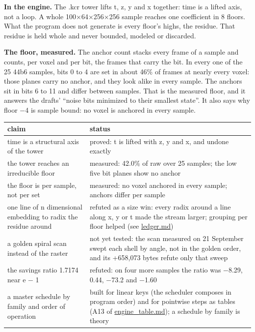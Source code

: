 \textbf{In the engine.} The .kcr tower lifts t, z, y and x together: time is a lifted axis, not a loop. A whole 100×64×256×256 sample reaches one coefficient in 8 floors. What the program does not generate is every floor's highs, the residue. That residue is held whole and never bounded, modeled or discarded.

\textbf{The floor, measured.} The anchor count stacks every frame of a sample and counts, per voxel and per bit, the frames that carry the bit. In every one of the 25 44b6 samples, bits 0 to 4 are set in about 46\% of frames at nearly every voxel: those planes carry no anchor, and they look alike in every sample. The anchors sit in bits 6 to 11 and differ between samples. That is the measured floor, and it answers the drafts' “noise bits minimized to their smallest state”. It also says why floor −4 is sample bound: no voxel is anchored in every sample.

{\small
\setlength{\tabcolsep}{6pt}
\begin{longtable}{>{\RaggedRight\arraybackslash}p{}>{\RaggedRight\arraybackslash}p{}}
\toprule
claim & status \\
\midrule
\endhead
time is a structural axis of the tower & proved: t is lifted with z, y and x, and undone exactly \\
the tower reaches an irreducible floor & measured: 42.0\% of raw over 25 samples; the low five bit planes show no anchor \\
the floor is per sample, not per set & measured: no voxel anchored in every sample; anchors differ per sample \\
one line of n dimensional embedding to radix the residue around & refuted as a size win: every radix around a line along x, y or t made the stream larger; grouping per floor helped (see \hyperref[chap:ledger]{ledger.md}) \\
a golden spiral scan instead of the raster & not yet tested: the scan measured on 21 September swept each shell by angle, not in the golden order, and its +658,073 bytes refute only that sweep \\
the savings ratio 1.7174 near e − 1 & refuted: on four more samples the ratio was −8.29, 0.44, −73.2 and −1.60 \\
a master schedule by family and order of operation & built for linear keys (the scheduler composes in program order) and for pointwise steps as tables (A13 of \hyperref[chap:engine-table]{engine\_\allowbreak{}table.md}); a schedule by family is theory \\
\bottomrule
\end{longtable}
}

